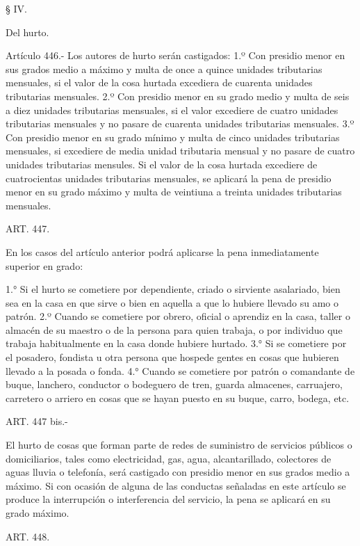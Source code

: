     § IV.

    Del hurto.


    Artículo 446.- Los autores de hurto serán castigados:
    1.º Con presidio menor en sus grados medio a máximo y multa de once a quince unidades tributarias mensuales, si el valor de la cosa hurtada excediera de cuarenta unidades tributarias mensuales.
    2.º Con presidio menor en su grado medio y multa de seis a diez unidades tributarias mensuales, si el valor excediere de cuatro unidades tributarias mensuales y no pasare de cuarenta unidades tributarias mensuales.
    3.º Con presidio menor en su grado mínimo y multa de cinco unidades tributarias mensuales, si excediere de media unidad tributaria mensual y no pasare de cuatro unidades tributarias mensules.
    Si el valor de la cosa hurtada excediere de cuatrocientas unidades tributarias mensuales, se aplicará la pena de presidio menor en su grado máximo y multa de veintiuna a treinta unidades tributarias mensuales.


    ART. 447.

    En los casos del artículo anterior podrá aplicarse la pena inmediatamente superior en grado:
   
    1.° Si el hurto se cometiere por dependiente, criado o sirviente asalariado, bien sea en la casa en que sirve o bien en aquella a que lo hubiere llevado su amo o patrón.
    2.º Cuando se cometiere por obrero, oficial o aprendiz en la casa, taller o almacén de su maestro o de la persona para quien trabaja, o por individuo que trabaja habitualmente en la casa donde hubiere hurtado.
    3.° Si se cometiere por el posadero, fondista u otra persona que hospede gentes en cosas que hubieren llevado a la posada o fonda.
    4.° Cuando se cometiere por patrón o comandante de buque, lanchero, conductor o bodeguero de tren, guarda almacenes, carruajero, carretero o arriero en cosas que se hayan puesto en su buque, carro, bodega, etc.



    ART. 447 bis.-

    El hurto de cosas que forman parte de redes de suministro de servicios públicos o domiciliarios, tales como electricidad, gas, agua, alcantarillado, colectores de aguas lluvia o telefonía, será castigado con presidio menor en sus grados medio a máximo.
    Si con ocasión de alguna de las conductas señaladas en este artículo se produce la interrupción o interferencia del servicio, la pena se aplicará en su grado máximo.


    ART. 448.

